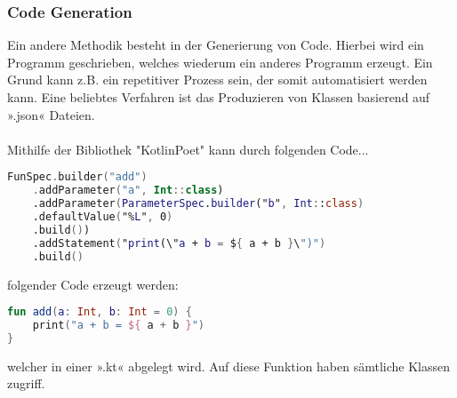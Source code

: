 \subsubsection{Code Generation}
Ein andere Methodik besteht in der Generierung von Code. Hierbei wird ein Programm geschrieben, welches wiederum ein anderes Programm erzeugt. Ein Grund kann z.B. ein repetitiver Prozess sein, der somit automatisiert werden kann. Eine beliebtes Verfahren ist das Produzieren von Klassen basierend auf ».json« Dateien.
\\
\\
Mithilfe der Bibliothek "KotlinPoet" kann durch folgenden Code...
\begin{lstlisting}[caption={Code zum erezugen einer Funktion}, label={lst:data-class}, language=Kotlin]
FunSpec.builder("add")
	.addParameter("a", Int::class)
	.addParameter(ParameterSpec.builder("b", Int::class)
	.defaultValue("%L", 0)
	.build())
	.addStatement("print(\"a + b = ${ a + b }\")")
	.build()
\end{lstlisting}
\bigskip
folgender Code erzeugt werden:
\begin{lstlisting}[caption={Erzeugte Funktionen}, label={lst:data-class}, language=Kotlin]
fun add(a: Int, b: Int = 0) {
	print("a + b = ${ a + b }")
}
\end{lstlisting}
welcher in einer ».kt« abgelegt wird. Auf diese Funktion haben sämtliche Klassen zugriff.
